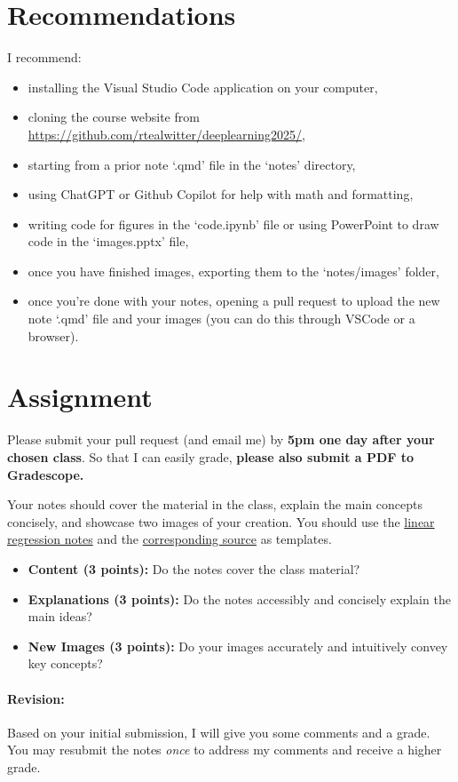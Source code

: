 \documentclass{article}
\begin{document}
\section*{Recommendations}
I recommend:
\begin{itemize}
    \item installing the Visual Studio Code application on your computer,
    \item cloning the course website from \url{https://github.com/rtealwitter/deeplearning2025/},
    \item starting from a prior note `.qmd' file in the `notes' directory,
    \item using ChatGPT or Github Copilot for help with math and formatting,
    \item writing code for figures in the `code.ipynb' file or using PowerPoint to draw code in the `images.pptx' file,
    \item once you have finished images, exporting them to the `notes/images' folder,
    \item once you're done with your notes, opening a pull request to upload the new note `.qmd' file and your images (you can do this through VSCode or a browser).
\end{itemize}

\section*{Assignment}
Please submit your pull request (and email me) by \textbf{5pm one day after your chosen class}.
So that I can easily grade, \textbf{please also submit a PDF to Gradescope.}

Your notes should cover the material in the class, explain the main concepts concisely, and showcase two images of your creation. You should use the \href{https://www.rtealwitter.com/deeplearning2025/notes/01_regression.html}{linear regression notes} and the \href{https://github.com/rtealwitter/deeplearning2025/blob/main/notes/01_regression.qmd}{corresponding source} as templates.

\begin{itemize}
    \item \textbf{Content (3 points):} Do the notes cover the class material?
    \item \textbf{Explanations (3 points):} Do the notes accessibly and concisely explain the main ideas?
    \item \textbf{New Images (3 points):} Do your images accurately and intuitively convey key concepts? 
\end{itemize}

\paragraph{Revision:} Based on your initial submission, I will give you some comments and a grade. You may resubmit the notes \textit{once} to address my comments and receive a higher grade.
\end{document}
